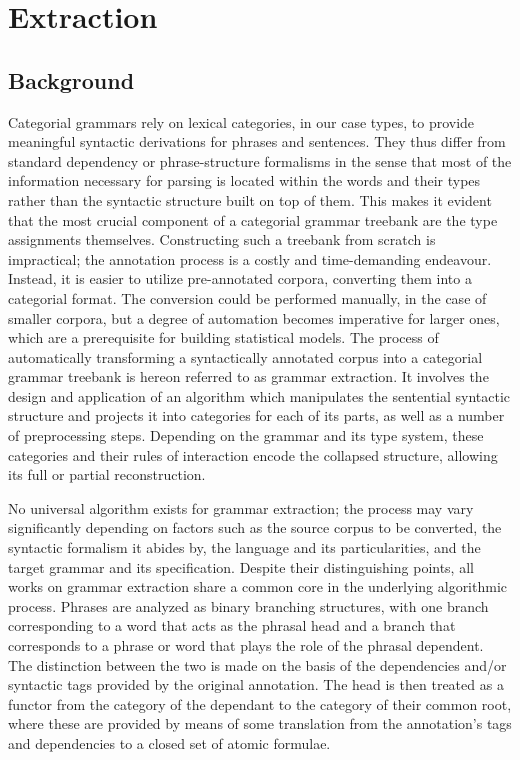 \chapter{Extraction}
\label{chapter:extraction}

\section{Background}
Categorial grammars rely on lexical categories, in our case types, to provide meaningful syntactic derivations for phrases and sentences.
They thus differ from standard dependency or phrase-structure formalisms in the sense that most of the information necessary for parsing is located within the words and their types rather than the syntactic structure built on top of them.
This makes it evident that the most crucial component of a categorial grammar treebank are the type assignments themselves.
Constructing such a treebank from scratch is impractical; the annotation process is a costly and time-demanding endeavour. 
Instead, it is easier to utilize pre-annotated corpora, converting them into a categorial format.
The conversion could be performed manually, in the case of smaller corpora, but a degree of automation becomes imperative for larger ones, which are a prerequisite for building statistical models.
The process of automatically transforming a syntactically annotated corpus into a categorial grammar treebank is hereon referred to as grammar extraction.
It involves the design and application of an algorithm which manipulates the sentential syntactic structure and projects it into categories for each of its parts, as well as a number of preprocessing steps.
Depending on the grammar and its type system, these categories and their rules of interaction encode the collapsed structure, allowing its full or partial reconstruction.

No universal algorithm exists for grammar extraction; the process may vary significantly depending on factors such as the source corpus to be converted, the syntactic formalism it abides by, the language and its particularities, and the target grammar and its specification.
Despite their distinguishing points, all works on grammar extraction share a common core in the underlying algorithmic process.
Phrases are analyzed as binary branching structures, with one branch corresponding to a word that acts as the phrasal head and a branch that corresponds to a phrase or word that plays the role of the phrasal dependent. 
The distinction between the two is made on the basis of the dependencies and/or syntactic tags provided by the original annotation.
The head is then treated as a functor from the category of the dependant to the category of their common root, where these are provided by means of some translation from the annotation's tags and dependencies to a closed set of atomic formulae.

